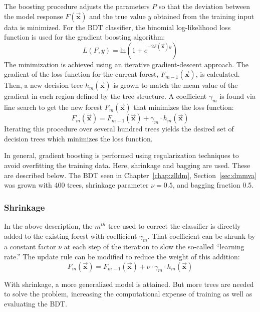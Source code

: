 The boosting procedure adjusts the parameters $P$ so that the deviation between the model response
$F(\vec{\mathbf{x}})$ and the true value $y$ obtained from the training input data is minimized.
For the BDT classifier, the binomial log-likelihood loss function is used for the gradient boosting algorithm:
\begin{equation}
L(F,y) = \mathrm{ln}\left(1+e^{-2F(\vec{\mathbf{x}}) y}\right)
\end{equation}
The minimization is achieved using an iterative gradient-descent approach.
The gradient of the loss function for the current forest, $F_{m-1}(\vec{\mathbf{x}})$, is calculated.
Then, a new decision tree $h_m(\vec{\mathbf{x}})$ is grown to match
the mean value of the gradient in each region defined by the tree structure.
A coefficient $\gamma_m$ is found via line search to get the new forest $F_m(\vec{\mathbf{x}})$
that minimizes the loss function:
\begin{equation}
F_m(\vec{\mathbf{x}}) = F_{m-1}(\vec{\mathbf{x}}) + \gamma_m \cdot h_m(\vec{\mathbf{x}})
\end{equation}
Iterating this procedure over several hundred trees yields the desired set of
decision trees which minimizes the loss function.

In general, gradient boosting is performed using regularization techniques 
to avoid overfitting the training data. Here, shrinkage and bagging are used.
These are described below.
The BDT seen in Chapter~\ref{chap:zlldm}, Section~\ref{sec:dmmva}
was grown with 400 trees, shrinkage parameter $\nu=0.5$, and bagging fraction 0.5.

\subsubsection{Shrinkage}
In the above description, the $m^{th}$ tree used to correct the classifier is directly added to the existing forest with coefficient $\gamma_m$.
That coefficient can be shrunk by a constant factor $\nu$ at each step of the iteration to slow the so-called ``learning rate.''
The update rule can be modified to reduce the weight of this addition:
\begin{equation}
F_m(\vec{\mathbf{x}}) = F_{m-1}(\vec{\mathbf{x}}) + \nu \cdot \gamma_m \cdot h_m(\vec{\mathbf{x}})
\end{equation}

With shrinkage, a more generalized model is attained.
But more trees are needed to solve the problem,
increasing the computational expense of training as well as evaluating the BDT.

